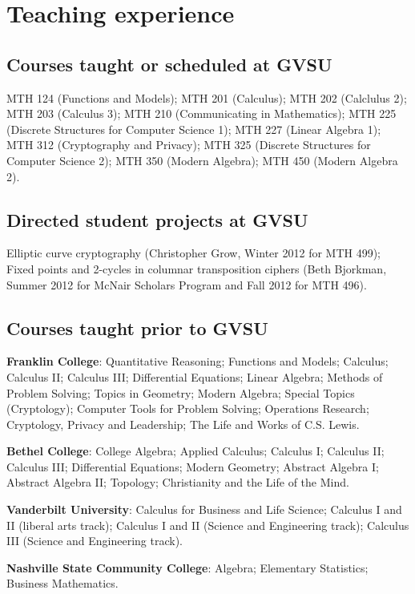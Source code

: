 \documentclass[letterpaper]{article}
\renewenvironment{itemize}{
  \begin{list}{}{
    \setlength{\leftmargin}{1.5em}
	\setlength{\itemsep}{0in}
  }
}{
  \end{list}
}
\begin{document}
\section*{Teaching experience}

\subsection*{Courses taught or scheduled at GVSU}
MTH 124 (Functions and Models); MTH 201 (Calculus); MTH 202 (Calclulus 2); MTH 203 (Calculus 3); MTH 210 (Communicating in Mathematics); MTH 225 (Discrete Structures for Computer Science 1); MTH 227 (Linear Algebra 1);  MTH 312 (Cryptography and Privacy); MTH 325 (Discrete Structures for Computer Science 2); MTH 350 (Modern Algebra); MTH 450 (Modern Algebra 2).


\subsection*{Directed student projects at GVSU}
Elliptic curve cryptography (Christopher Grow, Winter 2012 for MTH 499); Fixed points and 2-cycles in columnar transposition ciphers (Beth Bjorkman, Summer 2012 for McNair Scholars Program and Fall 2012 for MTH 496).

\subsection*{Courses taught prior to GVSU}

\begin{itemize}
	\item \textbf{Franklin College}: Quantitative Reasoning; Functions and Models; Calculus; Calculus II; Calculus III; Differential Equations; Linear Algebra; Methods of Problem Solving; Topics in Geometry; Modern Algebra; Special Topics (Cryptology); Computer Tools for Problem Solving; Operations Research; Cryptology, Privacy and Leadership; The Life and Works of C.S. Lewis.
	\item \textbf{Bethel College}: College Algebra; Applied Calculus; Calculus I; Calculus II; Calculus III; Differential Equations; Modern Geometry; Abstract Algebra I; Abstract Algebra II; Topology; Christianity and the Life of the Mind.
	\item \textbf{Vanderbilt University}: Calculus for Business and Life Science; Calculus I and II (liberal arts track); Calculus I and II (Science and Engineering track); Calculus III (Science and Engineering track).
	\item \textbf{Nashville State Community College}: Algebra; Elementary Statistics; Business Mathematics.
\end{itemize}
\end{document}
